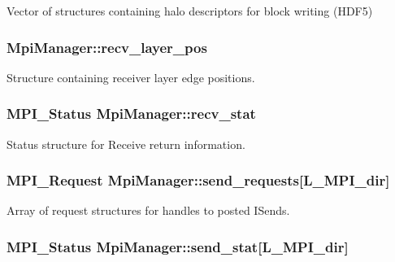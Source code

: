 Vector of structures containing halo descriptors for block writing (H\+D\+F5) 

\subsubsection[{\texorpdfstring{recv\+\_\+layer\+\_\+pos}{recv_layer_pos}}]{ Mpi\+Manager\+::recv\+\_\+layer\+\_\+pos}\hypertarget{class_mpi_manager_ad1ff57a97ec56efc1690dd3a5a52fd64}{}\label{class_mpi_manager_ad1ff57a97ec56efc1690dd3a5a52fd64}


Structure containing receiver layer edge positions. 

\subsubsection[{\texorpdfstring{recv\+\_\+stat}{recv_stat}}]{\setlength{\rightskip}{0pt plus 5cm}M\+P\+I\+\_\+\+Status Mpi\+Manager\+::recv\+\_\+stat}\hypertarget{class_mpi_manager_a257bc27e8099f1cbf5ac70b80d8eadaa}{}\label{class_mpi_manager_a257bc27e8099f1cbf5ac70b80d8eadaa}


Status structure for Receive return information. 

\subsubsection[{\texorpdfstring{send\+\_\+requests}{send_requests}}]{\setlength{\rightskip}{0pt plus 5cm}M\+P\+I\+\_\+\+Request Mpi\+Manager\+::send\+\_\+requests\mbox{[}{\bf L\+\_\+\+M\+P\+I\+\_\+dir}\mbox{]}}\hypertarget{class_mpi_manager_af096663b094d919caba62d4bdf8e7d88}{}\label{class_mpi_manager_af096663b094d919caba62d4bdf8e7d88}


Array of request structures for handles to posted I\+Sends. 

\subsubsection[{\texorpdfstring{send\+\_\+stat}{send_stat}}]{\setlength{\rightskip}{0pt plus 5cm}M\+P\+I\+\_\+\+Status Mpi\+Manager\+::send\+\_\+stat\mbox{[}{\bf L\+\_\+\+M\+P\+I\+\_\+dir}\mbox{]}}\hypertarget{class_mpi_manager_ab129fdffa1925677841f25bcd4507b5e}{}\label{class_mpi_manager_ab129fdffa1925677841f25bcd4507b5e}


